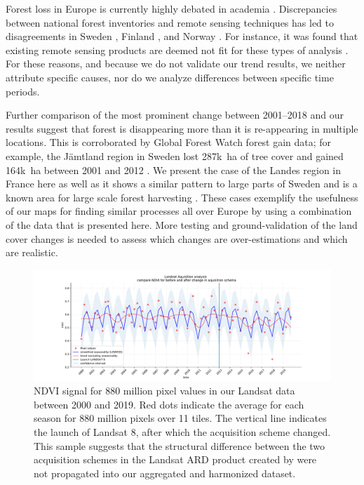 Forest loss in Europe is currently highly debated in academia \citep{senf2018canopy,ceccherini2020abrupt,senf2021mapping, palahi2021concerns, picard2021recent}. Discrepancies between national forest inventories and remote sensing techniques has led to disagreements in Sweden \citep{paulsson2020incorrect}, Finland \citep{korhonen2020new}, and Norway \citep{rossi2019assessing}. For instance, it was found that existing remote sensing products are deemed not fit for these types of analysis \citep{palahi2021concerns}. For these reasons, and because we do not validate our trend results, we neither attribute specific causes, nor do we analyze differences between specific time periods. 
    
Further comparison of the most prominent change between 2001--2018 and our results suggest that forest is disappearing more than it is re-appearing in multiple locations. This is corroborated by Global Forest Watch forest gain data; for example, the J\"{a}mtland region in Sweden lost 287k~ha of tree cover and gained 164k~ha between 2001 and 2012 \citep{hansen2013high}. We present the case of the Landes region in France here as well as it shows a similar pattern to large parts of Sweden and is a known area for large scale forest harvesting \citep{senf2021mapping}. These cases exemplify the usefulness of our maps for finding similar processes all over Europe by using a combination of the data that is presented here. More testing and ground-validation of the land cover changes is needed to assess which changes are over-estimations and which are realistic.
    
\begin{figure}[!hbt]
\centering
\hspace*{-1.5cm}
\includegraphics[width=1.2\textwidth]{figs_03/discussion_landsat_acquisition.pdf}
\caption{NDVI signal for 880 million pixel values in our Landsat data between 2000 and 2019. Red dots indicate the average for each season for 880 million pixels over 11 tiles. The vertical line indicates the launch of Landsat 8, after which the acquisition scheme changed. This sample suggests that the structural difference between the two acquisition schemes in the Landsat ARD product created by \citet{potapov2020landsat} were not propagated into our aggregated and harmonized dataset.} \label{fig:landsat_acquisition_vs_ndvi}
\end{figure}
        
